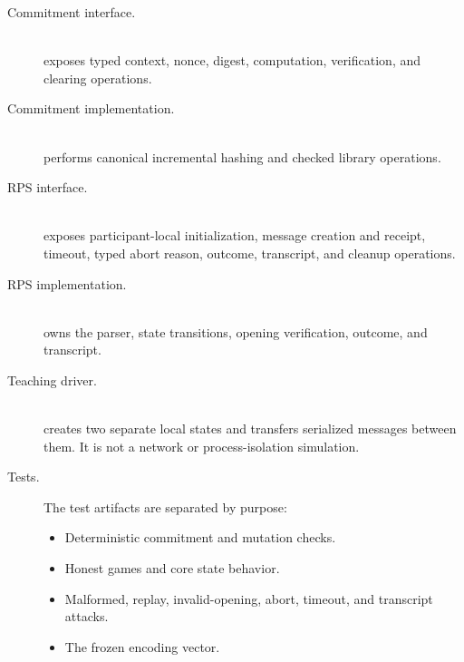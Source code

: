 \begin{description}
    \item[Commitment interface.] \leavevmode\\
     exposes typed
    context, nonce, digest, computation, verification, and clearing operations.
    \item[Commitment implementation.] \leavevmode\\
    performs canonical incremental hashing and checked library operations.
    \item[RPS interface.] \leavevmode\\
     exposes participant-local
    initialization, message creation and receipt, timeout, typed abort reason,
    outcome, transcript, and cleanup operations.
    \item[RPS implementation.] \leavevmode\\
     owns the parser,
    state transitions, opening verification, outcome, and transcript.
    \item[Teaching driver.] \leavevmode\\
     creates two
    separate local states and transfers serialized messages between them. It is
    not a network or process-isolation simulation.
    \item[Tests.] The test artifacts are separated by purpose:
    \begin{itemize}
        \item {}\par
        \noindent Deterministic commitment and mutation checks.\par
        \item {}\par
        \noindent Honest games and core state behavior.\par
        \item {}\par
        Malformed, replay, invalid-opening, abort, timeout, and transcript
        attacks.\par
        \item {}\par
        \noindent The frozen encoding vector.\par
    \end{itemize}
\end{description}

